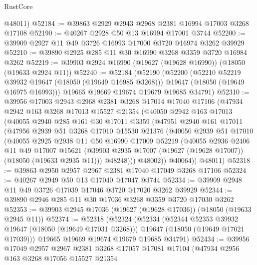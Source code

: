 \begin{lexlean}{RustCore}
\begin{coremodule}
      @48011)
@52184 := @39863 @2929 @2943 @2968 @2381 @16994 @17003 @3268 @17108
@52190 := @40267 @2928 @50 @13 @16994 @17001 @3744
@52200 := @39909 @2927 @11 @49 @3726 @16993 @17000 @3720 @16974 @3262 @39929
@52210 := @39890 @2925 @285 @11 @30 @16990 @3268 @3359 @3720 @16984 @3262
@52219 := @39903 @2924 @16990 (@19627 (@19628 @16990)) (@18050 (@19633 @2924 @11))
@52240 := @52184
    (@52190
      (@52200
        (@52210 @52219 @39932 @19647 (@18050 (@19649 @16985 @3268)))
        @19647
        (@18050 (@19649 @16975 @16993)))
      @19665
      @19669
      @19674
      @19679
      @19685
      @34791)
@52310 := @39956
    @17003
    @2943
    @2968
    @2381
    @3268
    @17014
    @17040
    @17106
    (@47934
      @2942
      @163
      @3268
      @17013
      @15527
      @21354
      (@40050
        @2942
        @163
        @17013
        (@40055
          @2940
          @285
          @161
          @30
          @17011
          @3359
          (@47951
            @2940
            @161
            @17011
            (@47956
              @2939
              @51
              @3268
              @17010
              @15530
              @21376
              (@40050
                @2939
                @51
                @17010
                (@40055
                  @2925
                  @2938
                  @11
                  @50
                  @16990
                  @17009
                  @52219
                  (@40055
                    @2936
                    @2406
                    @11
                    @49
                    @17007
                    @15621
                    (@39903 @2935 @17007 (@19627 (@19628 @17007)) (@18050 (@19633 @2935 @11)))
                    @48248)))
              @48002))
          @40064))
      @48011)
@52318 := @39863 @2950 @2957 @2967 @2381 @17040 @17049 @3268 @17106
@52324 := @40267 @2949 @50 @13 @17040 @17047 @3744
@52334 := @39909 @2948 @11 @49 @3726 @17039 @17046 @3720 @17020 @3262 @39929
@52344 := @39890 @2946 @285 @11 @30 @17036 @3268 @3359 @3720 @17030 @3262
@52353 := @39903 @2945 @17036 (@19627 (@19628 @17036)) (@18050 (@19633 @2945 @11))
@52374 := @52318
    (@52324
      (@52334
        (@52344 @52353 @39932 @19647 (@18050 (@19649 @17031 @3268)))
        @19647
        (@18050 (@19649 @17021 @17039)))
      @19665
      @19669
      @19674
      @19679
      @19685
      @34791)
@52434 := @39956
    @17049
    @2957
    @2967
    @2381
    @3268
    @17057
    @17081
    @17104
    (@47934
      @2956
      @163
      @3268
      @17056
      @15527
      @21354

\end{coremodule}
\end{lexlean}
